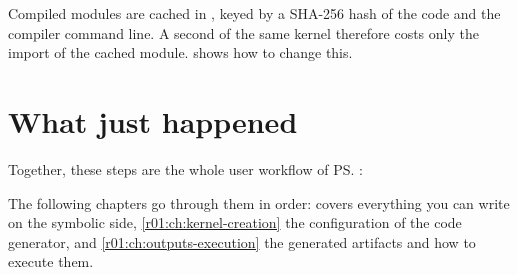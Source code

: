 \begin{note}
  Compiled modules are cached in , keyed by a SHA-256
  hash of the code and the compiler command line. A second  of the same
  kernel therefore costs only the import of the cached module.  shows how
  to change this.
\end{note}

\section{What just happened}

Together, these steps are the whole user workflow of \ps:
\begin{center}\small
{}
\end{center}
The following chapters go through them in order:
 covers everything you can write on the symbolic side,
\cref{r01:ch:kernel-creation} the configuration of the code generator, and
\cref{r01:ch:outputs-execution} the generated artifacts and how to execute them.
